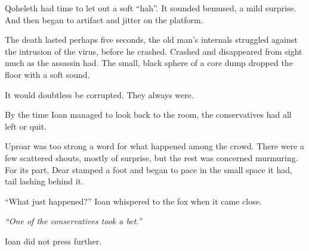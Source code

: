 Qoheleth had time to let out a soft ``hah''. It sounded bemused, a mild surprise. And then began to artifact and jitter on the platform.

The death lasted perhaps five seconds, the old man's internals struggled against the intrusion of the virus, before he crashed. Crashed and disappeared from sight much as the assassin had. The small, black sphere of a core dump dropped the floor with a soft sound.

It would doubtless be corrupted. They always were.

By the time Ioan managed to look back to the room, the conservatives had all left or quit.

Uproar was too strong a word for what happened among the crowd. There were a few scattered shouts, mostly of surprise, but the rest was concerned murmuring. For its part, Dear stamped a foot and began to pace in the small space it had, tail lashing behind it.

``What just happened?'' Ioan whispered to the fox when it came close.

\emph{``One of the conservatives took a bet.''}

Ioan did not press further.
